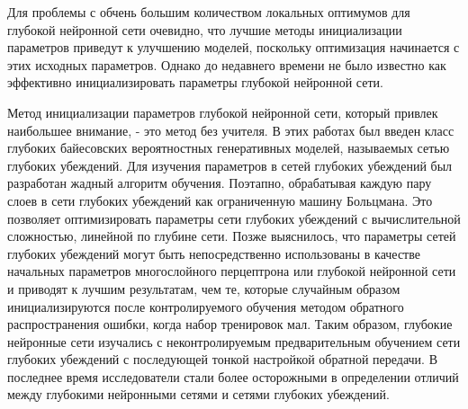 Для проблемы с обчень большим количеством локальных оптимумов для глубокой нейронной сети очевидно, что лучшие методы инициализации параметров приведут к улучшению моделей, поскольку оптимизация начинается с этих исходных параметров. Однако до недавнего времени не было известно как эффективно инициализировать параметры глубокой нейронной сети.

Метод инициализации параметров глубокой нейронной сети, который привлек наибольшее внимание, - это метод без учителя. В этих работах был введен класс глубоких байесовских вероятностных генеративных моделей, называемых сетью глубоких убеждений. Для изучения параметров в сетей глубоких убеждений был разработан жадный алгоритм обучения. Поэтапно, обрабатывая каждую пару слоев в сети глубоких убеждений как ограниченную машину Больцмана. Это позволяет оптимизировать параметры сети глубоких убеждений с вычислительной сложностью, линейной по глубине сети. Позже выяснилось, что параметры сетей глубоких убеждений могут быть непосредственно использованы в качестве начальных параметров многослойного перцептрона или глубокой нейронной сети и приводят к лучшим результатам, чем те, которые случайным образом инициализируются после контролируемого обучения методом обратного распространения ошибки, когда набор тренировок мал. Таким образом, глубокие нейронные сети изучались с неконтролируемым предварительным обучением сети глубоких убеждений с последующей тонкой настройкой обратной передачи. В последнее время исследователи стали более осторожными в определении отличий между глубокими нейронными сетями и сетями глубоких убеждений.

